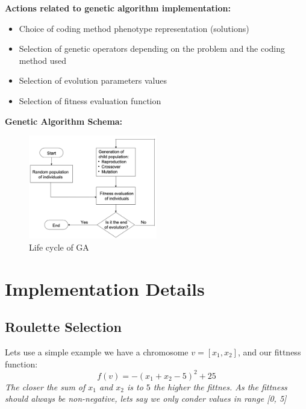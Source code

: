 \documentclass[11pt]{article}
\begin{document}
    \textbf{Actions related to genetic algorithm implementation:}
    \begin{itemize}
        \item Choice of coding method phenotype representation (solutions)
        \item Selection of genetic operators depending on the problem and the coding method used
        \item Selection of evolution parameters values
        \item Selection of fitness evaluation function
    \end{itemize}

    \break

    \textbf{Genetic Algorithm Schema:}
    \begin{figure}[h]
        \centering
        \includegraphics[width=0.5\textwidth]{../images/GA-LifeCycle}
        \caption{Life cycle of GA}\label{fig:image-GA-LifeCycle}
    \end{figure}


    \section{Implementation Details}\label{sec:implementation-details}

    \subsection{Roulette Selection}\label{subsec:roulette-reproduction}

    Lets use a simple example we have a chromosome $v = [x_1, x_2]$, and our fittness function:
    \begin{equation}
        f(v) = -(x_1 + x_2-5)^2 + 25
        \label{eq:fitness-f}
    \end{equation}
    \textit{The closer the sum of $x_1$ and $x_2$ is to $5$ the higher the fittnes. As the fittness should always be non-negative, lets say we only conder values in range [0, 5]}\\
\end{document}
